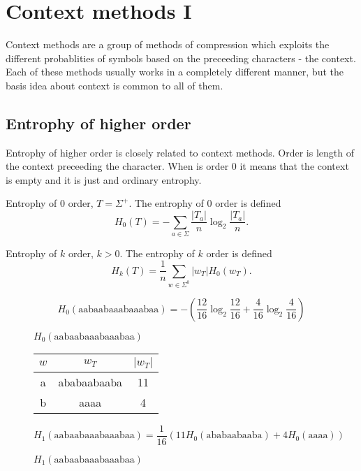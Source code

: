 \chapter{Context methods I}

Context methods are a group of methods of compression which exploits the different probablities of symbols based on the preceeding characters - the context. Each of these methods usually works in a completely different manner, but the basis idea about context is common to all of them.

\section{Entrophy of higher order}

Entrophy of higher order is closely related to context methods. Order is length of the context preceeding the character. When is order $0$ it means that the context is empty and it is just and ordinary entrophy.

\begin{dt}{Entrophy of $0$ order, $T = \Sigma^+$.}
  The entrophy of $0$ order is defined $$H_{0}(T) = - \sum_{a \in \Sigma} \frac{|T_a|}{n} \log_2 \frac{|T_a|}{n}.$$
\end{dt}

\begin{dt}{Entrophy of $k$ order, $k > 0$.}
  The entrophy of $k$ order is defined $$H_{k}(T) = \frac{1}{n} \sum_{w \in \Sigma^k} |w_T| H_0(w_T).$$
\end{dt}

\begin{figure}
    $$H_{0}(\text{aabaabaaabaaabaa}) = - (\frac{12}{16} \log_2 \frac{12}{16} + \frac{4}{16} \log_2 \frac{4}{16})$$
  \caption{$H_{0}(\text{aabaabaaabaaabaa})$}
\end{figure}

\begin{figure}
  \begin{center}
  \begin{tabular}{c|c|c}
    $w$ & $w_T$ & $|w_T|$ \\
    \hline
    a & ababaabaaba & 11 \\
    b & aaaa & 4 \\
  \end{tabular}
  \end{center}
    $$H_{1}(\text{aabaabaaabaaabaa}) = \frac{1}{16} (11 H_{0}(\text{ababaabaaba}) + 4 H_{0}(\text{aaaa}))$$
  \caption{$H_{1}(\text{aabaabaaabaaabaa})$}
\end{figure}


